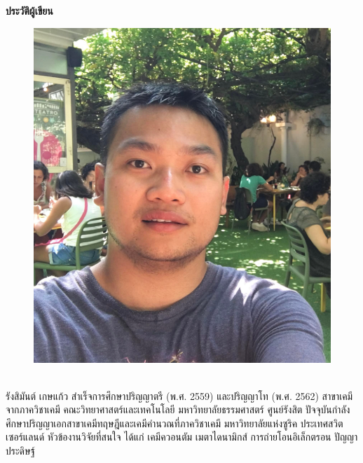 

{
\thispagestyle{empty}

\begin{center}
    \LARGE\textbf{ประวัติผู้เขียน}
\end{center}

\begin{minipage}[t][8cm][t]{\textwidth}
    \begin{figure}
        \includegraphics[width=0.9\linewidth]{fig/RK.png}
    \end{figure}
    \leavevmode
    \\
    \hspace*{1em} รังสิมันต์ เกษแก้ว สำเร็จการศึกษาปริญญาตรี (พ.ศ. 2559) และปริญญาโท (พ.ศ. 2562) สาขาเคมี จากภาควิชาเคมี 
    คณะวิทยาศาสตร์และเทคโนโลยี มหาวิทยาลัยธรรมศาสตร์ ศูนย์รังสิต ปัจจุบันกำลังศึกษาปริญญาเอกสาขาเคมีทฤษฎีและเคมีคำนวณที่ภาควิชาเคมี 
    มหาวิทยาลัยแห่งซูริค ประเทศสวิตเซอร์แลนด์ หัวข้องานวิจัยที่สนใจ ได้แก่ เคมีควอนตัม เมตาไดนามิกส์ การถ่ายโอนอิเล็กตรอน ปัญญาประดิษฐ์

\end{minipage}}
